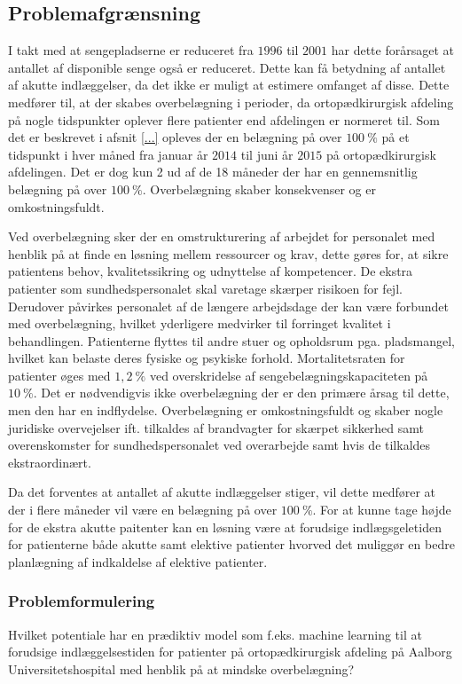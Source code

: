 \subsection{Problemafgrænsning}
I takt med at sengepladserne er reduceret fra $1996$ til $2001$ har dette forårsaget at antallet af disponible senge også er reduceret. Dette kan få betydning af antallet af akutte indlæggelser, da det ikke er muligt at estimere omfanget af disse. Dette medfører til, at der skabes overbelægning i perioder, da ortopædkirurgisk afdeling på nogle tidspunkter oplever flere patienter end afdelingen er normeret til. Som det er beskrevet i afsnit \ref{...} opleves der en belægning på over $100~\%$ på et tidspunkt i hver måned fra januar år $2014$ til juni år $2015$ på ortopædkirurgisk afdelingen. Det er dog kun 2 ud af de 18 måneder der har en gennemsnitlig belægning på over $100~\%$. Overbelægning skaber konsekvenser og er omkostningsfuldt.

Ved overbelægning sker der en omstrukturering af arbejdet for personalet med henblik på at finde en løsning mellem ressourcer og krav, dette gøres for, at sikre patientens behov, kvalitetssikring og udnyttelse af kompetencer. De ekstra patienter som sundhedspersonalet skal varetage skærper risikoen for fejl. Derudover påvirkes personalet af de længere arbejdsdage der kan være forbundet med overbelægning, hvilket yderligere medvirker til forringet kvalitet i behandlingen. Patienterne flyttes til andre stuer og opholdsrum pga. pladsmangel, hvilket kan belaste deres fysiske og psykiske forhold. Mortalitetsraten for patienter øges med $1,2~\%$ ved overskridelse af sengebelægningskapaciteten på $10~\%$. Det er nødvendigvis ikke  overbelægning der er den primære årsag til dette, men den har en indflydelse. Overbelægning er omkostningsfuldt og skaber nogle juridiske overvejelser ift. tilkaldes af brandvagter for skærpet sikkerhed samt overenskomster for sundhedspersonalet ved overarbejde samt hvis de tilkaldes ekstraordinært.

Da det forventes at antallet af akutte indlæggelser stiger, vil dette medfører at der i flere måneder vil være en belægning på over $100~\%$. For at kunne tage højde for de ekstra akutte paitenter kan en løsning være at forudsige indlægsgeletiden for patienterne både akutte samt elektive patienter hvorved det muliggør en bedre planlægning af indkaldelse af elektive patienter.

\subsubsection{Problemformulering}
Hvilket potentiale har en prædiktiv model som f.eks. machine learning til at forudsige indlæggelsestiden for patienter på ortopædkirurgisk afdeling på Aalborg Universitetshospital med henblik på at mindske overbelægning? 